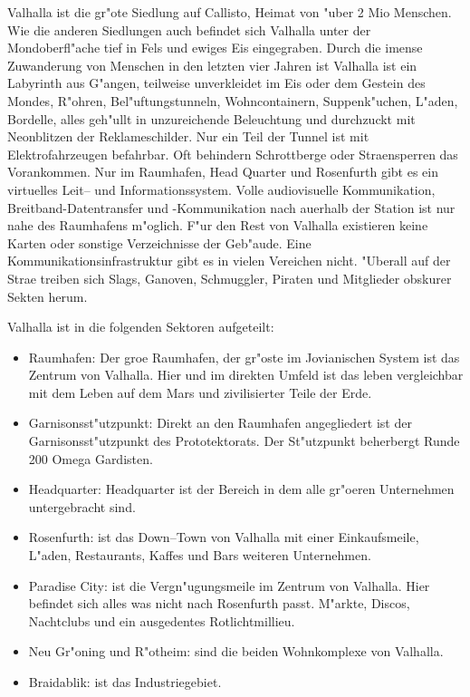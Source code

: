 Valhalla ist die gr"o\3te Siedlung auf Callisto, Heimat von "uber 2 Mio Menschen. Wie die anderen Siedlungen auch befindet sich Valhalla unter der Mondoberfl"ache tief in Fels und ewiges Eis eingegraben. Durch die imense Zuwanderung von Menschen in den letzten vier Jahren ist Valhalla ist ein Labyrinth aus G"angen, teilweise unverkleidet im Eis oder dem Gestein des Mondes, R"ohren, Bel"uftungstunneln, Wohncontainern, Suppenk"uchen, L"aden, Bordelle, alles geh"ullt in unzureichende Beleuchtung und durchzuckt mit Neonblitzen der Reklameschilder. Nur ein Teil der Tunnel ist mit Elektrofahrzeugen befahrbar. Oft behindern Schrottberge oder Stra\3ensperren das Vorankommen. Nur im Raumhafen, Head Quarter und Rosenfurth gibt es ein virtuelles Leit-- und Informationssystem. Volle audiovisuelle Kommunikation, Breitband-Datentransfer und -Kommunikation nach au\3erhalb der Station ist nur nahe des Raumhafens m"oglich. F"ur den Rest von Valhalla existieren keine Karten oder sonstige Verzeichnisse der Geb"aude. Eine Kommunikationsinfrastruktur gibt es in vielen Vereichen nicht. "Uberall auf der Stra\3e treiben sich Slags, Ganoven, Schmuggler, Piraten  und Mitglieder obskurer Sekten herum.

Valhalla ist in die folgenden Sektoren aufgeteilt:

\begin{itemize}
    \item Raumhafen: Der gro\3e Raumhafen, der gr"oste im Jovianischen System ist das Zentrum von Valhalla. Hier und im direkten Umfeld ist das leben vergleichbar mit dem Leben auf dem Mars und zivilisierter Teile der Erde.
    \item Garnisonsst"utzpunkt: Direkt an den Raumhafen angegliedert ist der Garnisonsst"utzpunkt des Prototektorats. Der St"utzpunkt beherbergt Runde 200 Omega Gardisten. 
    \item Headquarter: Headquarter ist der Bereich in dem alle gr"o\3eren Unternehmen untergebracht sind.
    \item Rosenfurth: ist das Down--Town  von Valhalla mit einer Einkaufsmeile, L"aden, Restaurants, Kaffes und Bars weiteren Unternehmen.
    \item Paradise City: ist die Vergn"ugungsmeile im Zentrum von Valhalla. Hier befindet sich alles was nicht nach Rosenfurth passt. M"arkte, Discos, Nachtclubs und ein ausgedentes Rotlichtmillieu.
    \item Neu Gr"oning und R"otheim: sind die beiden Wohnkomplexe von Valhalla.
    \item Braidablik: ist das Industriegebiet.
\end{itemize}

